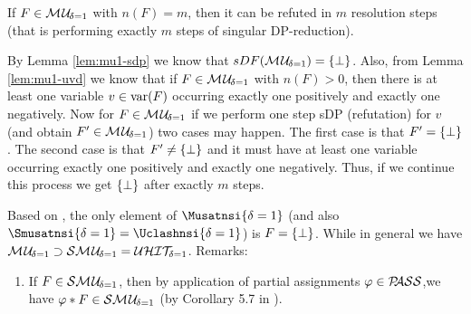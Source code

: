 \documentclass{report}
\begin{document}
\begin{lem}\label{lem:mu1-refu-tree}
If $F \in \mathcal{M\hspace{0.8pt}U}_{\!\delta=1}$ with $n(F)=m$, then it can be refuted in $m$ resolution steps (that is performing exactly $m$ steps of singular DP-reduction).
\end{lem}
\begin{prf}
By Lemma \ref{lem:mu1-sdp} we know that $sDF(\mathcal{M\hspace{0.8pt}U}_{\!\delta=1})=\{ \bot \}$. Also, from Lemma \ref{lem:mu1-uvd} we know that if $F \in \mathcal{M\hspace{0.8pt}U}_{\!\delta=1}$ with $n(F) > 0$, then there is at least one variable $v \in \operatorname{var}(F)$ occurring exactly one positively and exactly one negatively. Now for $F \in \mathcal{M\hspace{0.8pt}U}_{\!\delta=1}$ if we perform one step sDP (refutation) for $v$ (and obtain $F' \in \mathcal{M\hspace{0.8pt}U}_{\!\delta=1}$) two cases may happen. The first case is that $F' =\{ \bot \}$. The second case is that $F' \not = \{ \bot \}$ and it must have at least one variable occurring exactly one positively and exactly one negatively. Thus, if we continue this process we get $\{ \bot \}$ after exactly $m$ steps. 
\end{prf}

\begin{lem}\label{lem:mu1-sma-uhit}
Based on \cite{KullmannZhao2010Extremal}, the only element of $\Musatnsi{\delta=1}$ (and also $\Smusatnsi{\delta=1} = \Uclashnsi{\delta=1}$) is $F=\{ \bot \}$. While in general we have $\mathcal{M\hspace{0.8pt}U}_{\!\delta=1} \supset \mathcal{S}\mathcal{M\hspace{0.8pt}U}_{\!\delta=1} = \mathcal{U}\mathcal{HIT}_{\!\!\delta=1}$.
Remarks:
  \begin{enumerate}
  \item If $F \in \mathcal{S}\mathcal{M\hspace{0.8pt}U}_{\!\delta=1}$, then by application of partial assignments $\varphi \in \mathcal{P\hspace{-0.32em}ASS}$,we have $\varphi * F \in \mathcal{S}\mathcal{M\hspace{0.8pt}U}_{\!\delta=1}$ (by Corollary 5.7 in \cite{GwynneKullmann2013GoodRepresentations}).
  \end{enumerate} 
\end{lem}
\end{document}
